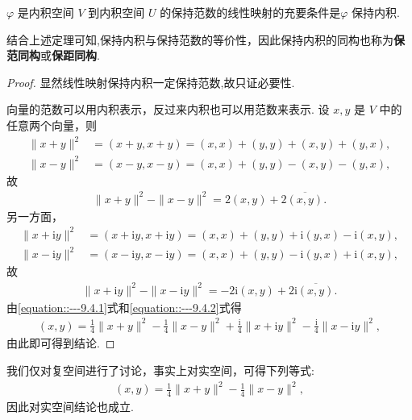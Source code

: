 \documentclass[../../main.tex]{subfiles}%
\begin{document}
\begin{theorem}\label{theorem:保范线性映射一定保持内积}
$\varphi$ 是内积空间 $V$ 到内积空间 $U$ 的保持范数的线性映射的充要条件是$\varphi$ 保持内积.
\end{theorem}
\begin{remark}
结合上述定理可知,保持内积与保持范数的等价性，因此保持内积的同构也称为\textbf{保范同构}或\textbf{保距同构}. 
\end{remark}
\begin{proof}
显然线性映射保持内积一定保持范数,故只证必要性.

向量的范数可以用内积表示，反过来内积也可以用范数来表示. 设 $x,y$ 是 $V$ 中的任意两个向量，则
\begin{align*}
\|x + y\|^2&=(x + y,x + y)=(x,x)+(y,y)+(x,y)+(y,x),\\
\|x - y\|^2&=(x - y,x - y)=(x,x)+(y,y)-(x,y)-(y,x),
\end{align*}
故
\begin{align}
\|x + y\|^2 - \|x - y\|^2 = 2(x,y) + 2\overline{(x,y)}.\label{equation::---9.4.1}
\end{align}
另一方面，
\begin{align*}
\|x + \mathrm{i}y\|^2&=(x + \mathrm{i}y,x + \mathrm{i}y)=(x,x)+(y,y)+\mathrm{i}(y,x)-\mathrm{i}(x,y),\\
\|x - \mathrm{i}y\|^2&=(x - \mathrm{i}y,x - \mathrm{i}y)=(x,x)+(y,y)-\mathrm{i}(y,x)+\mathrm{i}(x,y),
\end{align*}
故
\begin{align}
\|x + \mathrm{i}y\|^2 - \|x - \mathrm{i}y\|^2 = -2\mathrm{i}(x,y) + 2\mathrm{i}\overline{(x,y)}.\label{equation::---9.4.2}
\end{align}
由\eqref{equation::---9.4.1}式和\eqref{equation::---9.4.2}式得
\begin{align*}
(x,y) = \frac{1}{4}\|x + y\|^2 - \frac{1}{4}\|x - y\|^2 + \frac{\mathrm{i}}{4}\|x + \mathrm{i}y\|^2 - \frac{\mathrm{i}}{4}\|x - \mathrm{i}y\|^2,
\end{align*}
由此即可得到结论.
\end{proof}
\begin{remark}
我们仅对复空间进行了讨论，事实上对实空间，可得下列等式:
\begin{align*}
(x,y) = \frac{1}{4}\|x + y\|^2 - \frac{1}{4}\|x - y\|^2,
\end{align*}
因此对实空间结论也成立. 
\end{remark}
\end{document}
